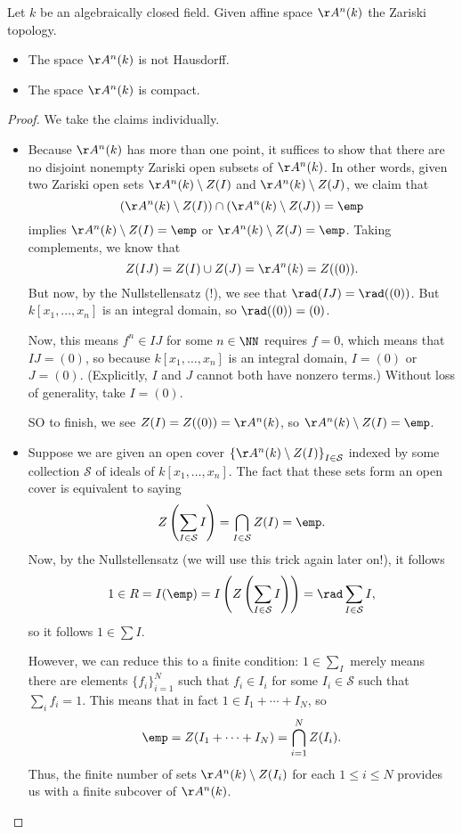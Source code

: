 \begin{proposition}
	Let $k$ be an algebraically closed field. Given affine space $\AA^n(k)$ the Zariski topology.
	\begin{itemize}
		\item The space $\AA^n(k)$ is not Hausdorff.
		\item The space $\AA^n(k)$ is compact.
	\end{itemize}
\end{proposition}
\begin{proof}
	We take the claims individually.
	\begin{itemize}
		\item Because $\AA^n(k)$ has more than one point, it suffices to show that there are no disjoint nonempty Zariski open subsets of $\AA^n(k)$. In other words, given two Zariski open sets $\AA^n(k)\setminus Z(I)$ and $\AA^n(k)\setminus Z(J)$, we claim that
		\[\left(\AA^n(k)\setminus Z(I)\right)\cap\left(\AA^n(k)\setminus Z(J)\right)=\emp\]
		implies $\AA^n(k)\setminus Z(I)=\emp$ or $\AA^n(k)\setminus Z(J)=\emp$. Taking complements, we know that
		\[Z(IJ)=Z(I)\cup Z(J)=\AA^n(k)=Z((0)).\]
		But now, by the Nullstellensatz (!), we see that $\rad(IJ)=\rad((0))$. But $k[x_1,\ldots,x_n]$ is an integral domain, so $\rad((0))=(0)$.
		
		Now, this means $f^n\in IJ$ for some $n\in\NN$ requires $f=0$, which means that $IJ=(0)$, so because $k[x_1,\ldots,x_n]$ is an integral domain, $I=(0)$ or $J=(0)$. (Explicitly, $I$ and $J$ cannot both have nonzero terms.) Without loss of generality, take $I=(0)$.

		SO to finish, we see $Z(I)=Z((0))=\AA^n(k)$, so $\AA^n(k)\setminus Z(I)=\emp$.
		\item Suppose we are given an open cover $\left\{\AA^n(k)\setminus Z(I)\right\}_{I\in\mathcal S}$ indexed by some collection $\mathcal S$ of ideals of $k[x_1,\ldots,x_n]$. The fact that these sets form an open cover is equivalent to saying
		\[Z\left(\sum_{I\in\mathcal S}I\right)=\bigcap_{I\in\mathcal S}Z(I)=\emp.\]
		Now, by the Nullstellensatz (we will use this trick again later on!), it follows
		\[1\in R=I(\emp)=I\left(Z\left(\sum_{I\in\mathcal S} I\right)\right)=\rad\sum_{I\in\mathcal S} I,\]
		so it follows $1\in\sum I$.

		However, we can reduce this to a finite condition: $1\in\sum_I$ merely means there are elements $\{f_i\}_{i=1}^N$ such that $f_i\in I_i$ for some $I_i\in\mathcal S$ such that $\sum_if_i=1$. This means that in fact $1\in I_1+\cdots+I_N$, so
		\[\emp=Z(I_1+\cdots+I_N)=\bigcap_{i=1}^NZ(I_i).\]
		Thus, the finite number of sets $\AA^n(k)\setminus Z(I_i)$ for each $1\le i\le N$ provides us with a finite subcover of $\AA^n(k)$.
		\qedhere
	\end{itemize}
\end{proof}
